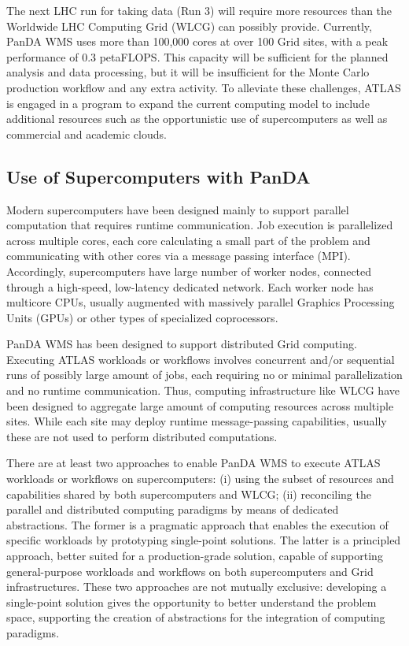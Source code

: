 The next LHC run for taking data (Run 3) will require more resources than the
Worldwide LHC Computing Grid (WLCG) can possibly provide. Currently, PanDA WMS
uses more than 100,000 cores at over 100 Grid sites, with a peak performance of
0.3 petaFLOPS. This capacity will be sufficient for the planned analysis and
data processing, but it will be insufficient for the Monte Carlo production
workflow and any extra activity. To alleviate these challenges, ATLAS is engaged
in a program to expand the current computing model to include additional
resources such as the opportunistic use of supercomputers as well as commercial
and academic clouds.

\subsection{Use of Supercomputers with PanDA}

Modern supercomputers have been designed mainly to support parallel computation
that requires runtime communication. Job execution is parallelized across
multiple cores, each core calculating a small part of the problem and
communicating with other cores via a message passing interface (MPI).
Accordingly, supercomputers have large number of worker nodes, connected through
a high-speed, low-latency dedicated network. Each worker node has multicore
CPUs, usually augmented with massively parallel Graphics Processing Units (GPUs)
or other types of specialized coprocessors.

PanDA WMS has been designed to support distributed Grid
computing.
Executing ATLAS workloads or workflows involves concurrent and/or sequential
runs of possibly large amount of jobs, each requiring no or minimal
parallelization and no runtime communication. Thus, computing infrastructure
like WLCG have been designed to aggregate large amount of computing resources
across multiple sites.
 While each site may
deploy runtime message-passing capabilities, usually these are not used to
perform distributed computations.

There are at least two approaches to enable PanDA WMS to execute ATLAS workloads
or workflows on supercomputers: (i) using the subset of resources and
capabilities shared by both supercomputers and WLCG; (ii) reconciling the
parallel and distributed computing paradigms by means of dedicated abstractions.
The former is a pragmatic approach that enables the execution of specific
workloads by prototyping single-point solutions. The latter is a principled
approach, better suited for a production-grade solution, capable of supporting
general-purpose workloads and workflows on both supercomputers and Grid
infrastructures. These two approaches are not mutually exclusive: developing a
single-point solution gives the opportunity to better understand the problem
space, supporting the creation of abstractions for the integration of computing
paradigms.

